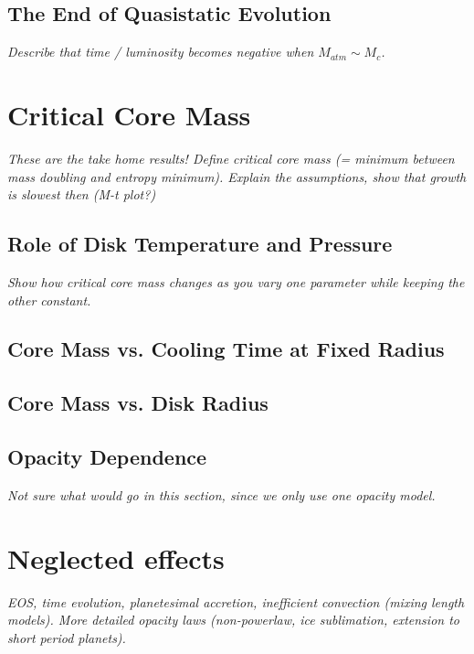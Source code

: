 \documentclass[apj]{emulateapj}
\newcommand{\emgr}[1]{\emph{ \color{gray} #1}}
\begin{document}
\subsection{The End of Quasistatic Evolution}
\emgr{Describe that time / luminosity becomes negative when $M_{atm} \sim M_c$.}

\section{Critical Core Mass}
\emgr{These are the take home results! Define critical core mass (= minimum between mass doubling and entropy minimum). Explain the assumptions, show that growth is slowest then (M-t plot?)}

\subsection{Role of Disk Temperature and Pressure}
\emgr{Show how critical core mass changes as you vary one parameter while keeping the other constant.}

\subsection{Core Mass vs. Cooling Time at Fixed Radius}

\subsection{Core Mass vs. Disk Radius}

\subsection{Opacity Dependence}
\emgr{Not sure what would go in this section, since we only use one opacity model.}





\section{Neglected effects}
\emgr{EOS, time evolution, planetesimal accretion, inefficient convection (mixing length models).  More detailed opacity laws (non-powerlaw, ice sublimation, extension to short period planets). }
\end{document}
